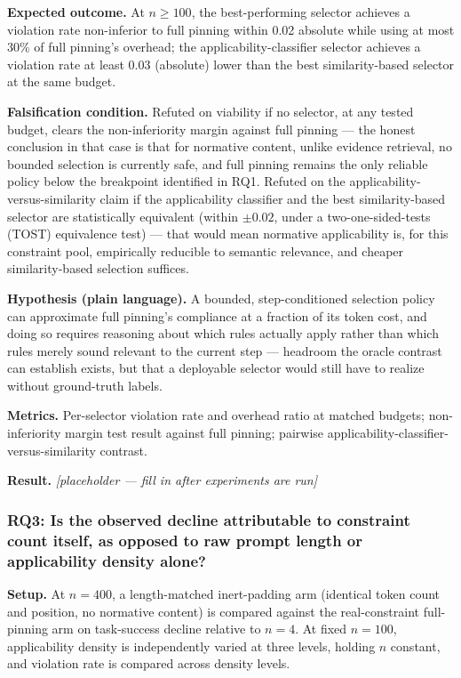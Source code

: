 \documentclass[11pt]{article}
\newcommand{\ph}{\textit{[placeholder --- fill in after experiments are run]}}
\begin{document}
\textbf{Expected outcome.} At $n \geq 100$, the best-performing selector achieves a violation rate non-inferior to full pinning within 0.02 absolute while using at most 30\% of full pinning's overhead; the applicability-classifier selector achieves a violation rate at least 0.03 (absolute) lower than the best similarity-based selector at the same budget.

\textbf{Falsification condition.} Refuted on viability if no selector, at any tested budget, clears the non-inferiority margin against full pinning --- the honest conclusion in that case is that for normative content, unlike evidence retrieval, no bounded selection is currently safe, and full pinning remains the only reliable policy below the breakpoint identified in RQ1. Refuted on the applicability-versus-similarity claim if the applicability classifier and the best similarity-based selector are statistically equivalent (within $\pm0.02$, under a two-one-sided-tests (TOST) equivalence test) --- that would mean normative applicability is, for this constraint pool, empirically reducible to semantic relevance, and cheaper similarity-based selection suffices.

\textbf{Hypothesis (plain language).} A bounded, step-conditioned selection policy can approximate full pinning's compliance at a fraction of its token cost, and doing so requires reasoning about which rules actually apply rather than which rules merely sound relevant to the current step --- headroom the oracle contrast can establish exists, but that a deployable selector would still have to realize without ground-truth labels.

\textbf{Metrics.} Per-selector violation rate and overhead ratio at matched budgets; non-inferiority margin test result against full pinning; pairwise applicability-classifier-versus-similarity contrast.

\textbf{Result.} \ph

\subsubsection{RQ3: Is the observed decline attributable to constraint count itself, as opposed to raw prompt length or applicability density alone?}
\textbf{Setup.} At $n=400$, a length-matched inert-padding arm (identical token count and position, no normative content) is compared against the real-constraint full-pinning arm on task-success decline relative to $n=4$. At fixed $n=100$, applicability density is independently varied at three levels, holding $n$ constant, and violation rate is compared across density levels.
\end{document}
